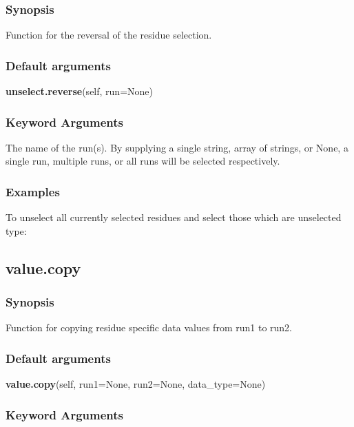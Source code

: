 \subsubsection{Synopsis}

Function for the reversal of the residue selection.

\subsubsection{Default arguments}

\textsf{\textbf{unselect.reverse}(self, run=None)}


\subsubsection{Keyword Arguments}

  The name of the run(s).  By supplying a single string, array of strings, or None, a single run, multiple runs, or all runs will be selected respectively.

\subsubsection{Examples}

To unselect all currently selected residues and select those which are unselected type:




\newpage

\subsection{value.copy}


\subsubsection{Synopsis}

Function for copying residue specific data values from run1 to run2.

\subsubsection{Default arguments}

\textsf{\textbf{value.copy}(self, run1=None, run2=None, data\_type=None)}


\subsubsection{Keyword Arguments}

